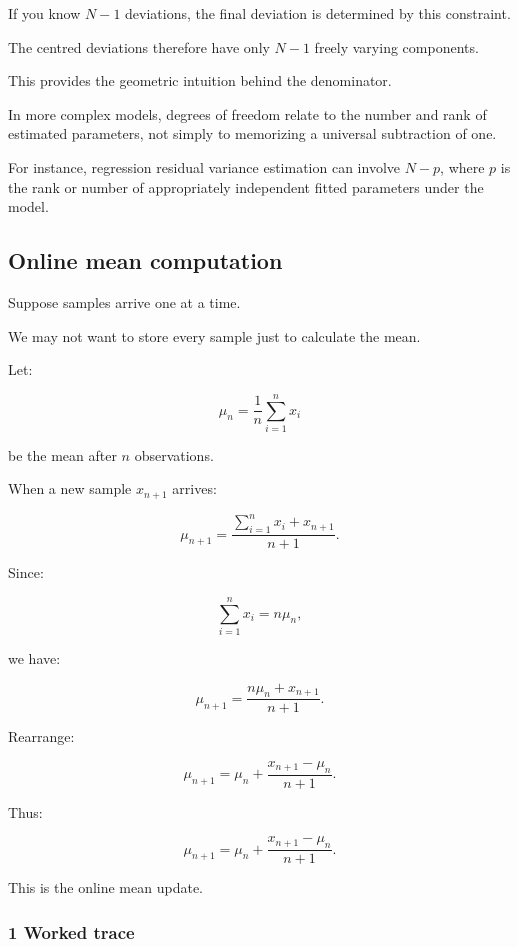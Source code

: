 If you know \(N-1\) deviations, the final deviation is determined by this constraint.

The centred deviations therefore have only \(N-1\) freely varying components.

This provides the geometric intuition behind the denominator.

In more complex models, degrees of freedom relate to the number and rank of estimated parameters, not simply to memorizing a universal subtraction of one.

For instance, regression residual variance estimation can involve \(N-p\), where \(p\) is the rank or number of appropriately independent fitted parameters under the model.

\subsection{Online mean computation}\label{02-foundations-ii-ch030-online-mean-computation}

\hypertarget{02-foundations-ii-ch030-online-mean-computation}{}

Suppose samples arrive one at a time.

We may not want to store every sample just to calculate the mean.

Let:

\[
 \mu_n= \frac1n\sum_{i=1}^{n}x_i
\]

be the mean after \(n\) observations.

When a new sample \(x_{n+1}\) arrives:

\[
 \mu_{n+1} = \frac{ \sum_{i=1}^{n}x_i+x_{n+1} }{ n+1 }.
\]

Since:

\[
 \sum_{i=1}^{n}x_i=n\mu_n,
\]

we have:

\[
 \mu_{n+1} = \frac{n\mu_n+x_{n+1}}{n+1}.
\]

Rearrange:

\[
 \mu_{n+1} = \mu_n+ \frac{x_{n+1}-\mu_n}{n+1}.
\]

Thus:

\[
 \boxed{ \mu_{n+1} = \mu_n+ \frac{x_{n+1}-\mu_n}{n+1} }.
\]

This is the online mean update.

\subsubsection{1 Worked trace}\label{02-foundations-ii-ch030-worked-trace}

